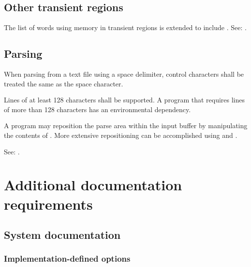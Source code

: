 \subsection{Other transient regions} %
\label{file:buffers}

The list of words using memory in transient regions is extended to
include . See: .

\subsection{Parsing} %
\label{file:parsing}

When parsing from a text file using a space delimiter, control
characters shall be treated the same as the space character.

Lines of at least 128 characters shall be supported. A program that
requires lines of more than 128 characters has an environmental
dependency.

A program may reposition the parse area within the input buffer by
manipulating the contents of . More extensive
repositioning can be accomplished using  and
.

See: .

\section{Additional documentation requirements} %

\subsection{System documentation} %

\subsubsection{Implementation-defined options} %
\label{file:impopt}

